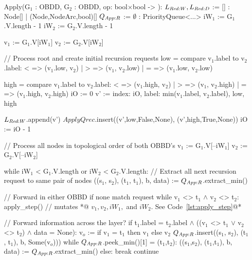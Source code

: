 \begin{lstfloat}[ht!]
  \centering

  \begin{blstlisting}
  Apply(G$_1$ : OBDD, G$_2$ : OBDD, op: bool$\times$bool -> ):
     $\ReduceLwork, \ReduceLdep$ := [] : Node[] | (Node,NodeArc,bool)[]
     $\ApplyQrec$ := $\emptyset$ : PriorityQueue<...>
     iW$_1$ := G$_1$.V.length - 1
     iW$_2$ := G$_2$.V.length - 1

     v$_1$ := G$_1$.V[iW$_1$]
     v$_2$ := G$_2$.V[iW$_2$]

     // Process root and create initial recursion requests
     low = compare v$_1$.label to v$_2$.label:  <  => (v$_1$.low, v$_2$)
                                       | > => (v$_1$, v$_2$.low)
                                       | = => (v$_1$.low, v$_2$.low)

     high = compare v$_1$.label to v$_2$.label:  <  => (v$_1$.high, v$_2$)
                                        | > => (v$_1$, v$_2$.high)
                                        | = => (v$_1$.high, v$_2$.high)
     iO := 0
     v' := { index: iO, label: min(v$_1$.label, v$_2$.label), low, high }

     $\ReduceLwork$.append(v')
     $ApplyQrec$.insert((v',low,False,None), (v',high,True,None))
     iO := iO - 1

     // Process all nodes in topological order of both OBBD's
     v$_1$ := G$_1$.V[--iW$_1$]
     v$_2$ := G$_2$.V[--iW$_2$]

     while iW$_1$ < G$_1$.V.length or iW$_2$ < G$_2$.V.length:
         // Extract all next recursion request to same pair of nodes
         ((s$_1$, s$_2$), (t$_1$, t$_1$), b, data) := $\ApplyQrec$.extract_min()

         // Forward in either OBBD if none match request
         while v$_1$ <> t$_1$ $\land$ v$_2$ <> t$_2$:
            apply_step() // mutates *@\color{gray} $v_1, v_2, \mathit{iW}_1,$ and $\mathit{iW}_2$. See Code~\ref{lst:apply_step}@*

         // Forward information across the layer?
         if t$_1$.label = t$_2$.label $\land$ ((v$_1$ <> t$_1$ $\lor$ v$_2$ <> t$_2$) $\land$ data = None):
             v$_o$ := if v$_1$ = t$_1$ then v$_1$ else v$_2$
             $\ApplyQrec$.insert((s$_1$, s$_2$), (t$_1$, t$_1$), b, Some(v$_o$)))
             while $\ApplyQrec$.peek_min()[1] = (t$_1$,t$_2$):
                     ((s$_1$,s$_2$), (t$_1$,t$_1$), b, data) := $\ApplyQrec$.extract_min()
             else: break
             continue


\end{blstlisting}
\end{lstfloat}
